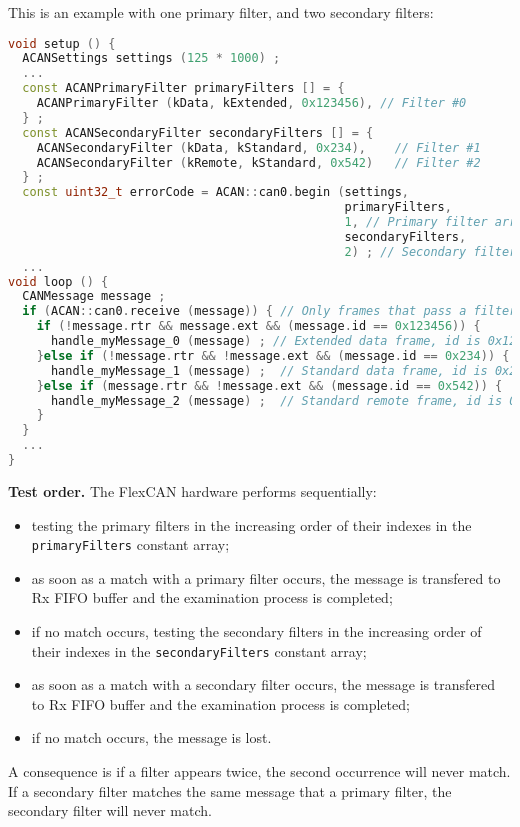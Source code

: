 \documentclass[10pt, a4paper, obeyspaces, openany]{extarticle}
\begin{document}
This is an example with one primary filter, and two secondary filters:
{ \small\begin{lstlisting}[language=c++]
void setup () {
  ACANSettings settings (125 * 1000) ;
  ...
  const ACANPrimaryFilter primaryFilters [] = {
    ACANPrimaryFilter (kData, kExtended, 0x123456), // Filter #0
  } ;
  const ACANSecondaryFilter secondaryFilters [] = {
    ACANSecondaryFilter (kData, kStandard, 0x234),    // Filter #1
    ACANSecondaryFilter (kRemote, kStandard, 0x542)   // Filter #2
  } ;
  const uint32_t errorCode = ACAN::can0.begin (settings,
                                               primaryFilters, 
                                               1, // Primary filter array size
                                               secondaryFilters,
                                               2) ; // Secondary filter array size
  ...
void loop () {
  CANMessage message ;
  if (ACAN::can0.receive (message)) { // Only frames that pass a filter are retrieved
    if (!message.rtr && message.ext && (message.id == 0x123456)) {
      handle_myMessage_0 (message) ; // Extended data frame, id is 0x123456
    }else if (!message.rtr && !message.ext && (message.id == 0x234)) {
      handle_myMessage_1 (message) ;  // Standard data frame, id is 0x234
    }else if (message.rtr && !message.ext && (message.id == 0x542)) {
      handle_myMessage_2 (message) ;  // Standard remote frame, id is 0x542
    }
  }
  ...
}
\end{lstlisting}}


{\bf Test order.} The FlexCAN hardware performs sequentially:
\begin{itemize}
  \item testing the primary filters in the increasing order of their indexes in the \texttt{primaryFilters} constant array;
  \item as soon as a match with a primary filter occurs, the message is transfered to Rx FIFO buffer and the examination process is completed;
  \item if no match occurs, testing the secondary filters in the increasing order of their indexes in the \texttt{secondaryFilters} constant array;
  \item as soon as a match with a secondary filter occurs, the message is transfered to Rx FIFO buffer and the examination process is completed;
  \item if no match occurs, the message is lost.
\end{itemize}

A consequence is if a filter appears twice, the second occurrence will never match. If a secondary filter matches the same message that a primary filter, the secondary filter will never match.
\end{document}
